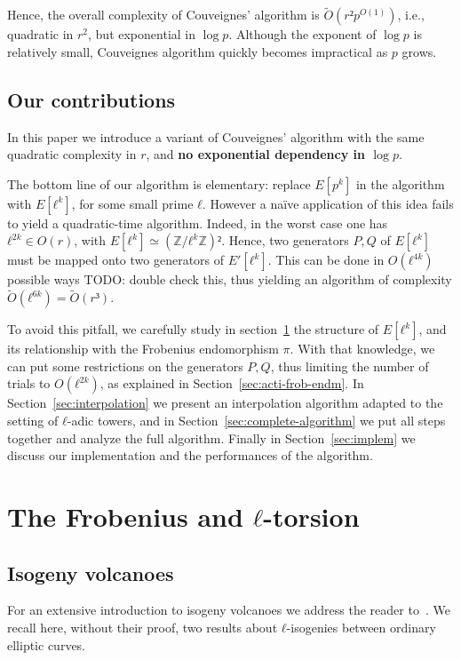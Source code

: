 \documentclass{lms}
\newcommand{\todo}[1]{{\color{red}TODO: #1}}
\newcommand{\tildO}{\tilde{O}}
\begin{document}
Hence, the overall complexity of Couveignes' algorithm is
$\tildO(r²p^{O(1)})$, i.e., quadratic in $r^2$, but exponential in
$\log p$. Although the exponent of $\log p$ is relatively small, Couveignes
algorithm quickly becomes impractical as $p$ grows.

\subsection{Our contributions}

In this paper we
introduce a variant of Couveignes' algorithm with the same quadratic
complexity in $r$, and \textbf{no exponential dependency in $\log p$}.

The bottom line of our algorithm is elementary: replace $E[p^k]$ in
the algorithm with $E[ℓ^k]$, for some small prime $ℓ$. However a
naïve application of this idea fails to yield a quadratic-time
algorithm. Indeed, in the worst case one has $ℓ^{2k}∈O(r)$, with
$E[ℓ^k]≃(ℤ/ℓ^kℤ)²$. Hence, two generators $P,Q$ of $E[ℓ^k]$ must
be mapped onto two generators of $E'[ℓ^k]$. This can be done in
$O(ℓ^{4k})$ possible ways \todo{double check this}, thus yielding an
algorithm of complexity $\tildO(ℓ^{6k})=\tildO(r³)$.

To avoid this pitfall, we carefully study
in section~\ref{sec:isogeny-volcanoes} the structure of
$E[ℓ^k]$, and its relationship with the Frobenius endomorphism $π$.
With that knowledge, we can put some restrictions on the generators $P,Q$,
thus limiting the number of trials to $O(ℓ^{2k})$,
as explained in Section~\ref{sec:acti-frob-endm}.
In Section~\ref{sec:interpolation}
we present an interpolation algorithm adapted to the setting of
$ℓ$-adic towers, and in Section~\ref{sec:complete-algorithm} we put
all steps together and analyze the full algorithm. Finally in
Section~\ref{sec:implem} we discuss our implementation and the
performances of the algorithm.



\section{The Frobenius and $ℓ$-torsion}
\label{sec:isogeny-volcanoes}
\subsection{Isogeny volcanoes}

For an extensive introduction to isogeny volcanoes we address the
reader to~\cite{sutherland2013isogeny}.  We recall here, without their
proof, two results about $ℓ$-isogenies between ordinary elliptic
curves.
\end{document}
